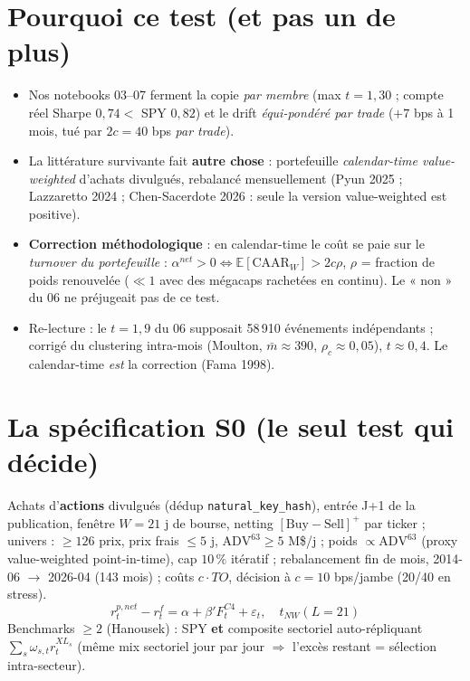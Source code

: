 \documentclass[10pt,a4paper,twocolumn]{article}
\begin{document}

\section{Pourquoi ce test (et pas un de plus)}
\begin{itemize}
  \item Nos notebooks 03--07 ferment la copie \emph{par membre} (max $t{=}1{,}30$ ; compte réel Sharpe $0{,}74<$ SPY $0{,}82$) et le drift \emph{équi-pondéré par trade} ($+7$ bps à 1 mois, tué par $2c=40$ bps \emph{par trade}).
  \item La littérature survivante fait \textbf{autre chose} : portefeuille \emph{calendar-time value-weighted} d'achats divulgués, rebalancé mensuellement (Pyun 2025 ; Lazzaretto 2024 ; Chen-Sacerdote 2026 : seule la version value-weighted est positive).
  \item \textbf{Correction méthodologique} : en calendar-time le coût se paie sur le \emph{turnover du portefeuille} : $\alpha^{net}>0 \iff \mathbb{E}[\mathrm{CAAR}_W] > 2c\rho$, $\rho$ = fraction de poids renouvelée ($\ll 1$ avec des mégacaps rachetées en continu). Le « non » du 06 ne préjugeait pas de ce test.
  \item Re-lecture : le $t{=}1{,}9$ du 06 supposait 58\,910 événements indépendants ; corrigé du clustering intra-mois (Moulton, $\bar m\approx390$, $\rho_c\approx0{,}05$), $t\approx0{,}4$. Le calendar-time \emph{est} la correction (Fama 1998).
\end{itemize}

\section{La spécification S0 (le seul test qui décide)}
Achats d'\textbf{actions} divulgués (dédup \texttt{natural\_key\_hash}), entrée J+1 de la publication, fenêtre $W=21$ j de bourse, netting $[\mathrm{Buy}-\mathrm{Sell}]^+$ par ticker ; univers : $\geq126$ prix, prix frais $\leq5$ j, $\mathrm{ADV}^{63}\geq5$ M\$/j ; poids $\propto \mathrm{ADV}^{63}$ (proxy value-weighted point-in-time), cap $10\,\%$ itératif ; rebalancement fin de mois, 2014-06 $\to$ 2026-04 (143 mois) ; coûts $c\cdot TO$, décision à $c=10$ bps/jambe (20/40 en stress).
\[
r^{p,net}_t - r^f_t = \alpha + \beta' F^{C4}_t + \varepsilon_t,\quad t_{NW}(L{=}21)
\]
Benchmarks $\geq2$ (Hanousek) : SPY \textbf{et} composite sectoriel auto-répliquant $\sum_s \omega_{s,t} r^{XL_s}_t$ (même mix sectoriel jour par jour $\Rightarrow$ l'excès restant = sélection intra-secteur).
\end{document}
